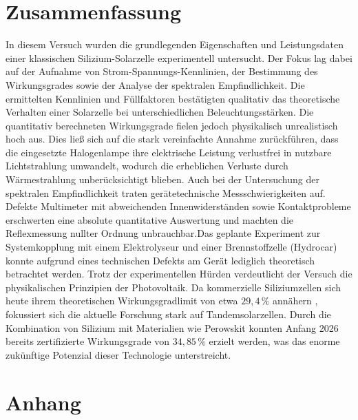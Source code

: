 \documentclass[11pt,a4paper]{article}
\numberwithin{equation}{section}
\begin{document}
\section{Zusammenfassung}
In diesem Versuch wurden die grundlegenden Eigenschaften und Leistungsdaten einer klassischen Silizium-Solarzelle experimentell untersucht. Der Fokus lag dabei auf der Aufnahme von Strom-Spannungs-Kennlinien, der Bestimmung des Wirkungsgrades sowie der Analyse der spektralen Empfindlichkeit.
\noindent Die ermittelten Kennlinien und Füllfaktoren bestätigten qualitativ das theoretische Verhalten einer Solarzelle bei unterschiedlichen Beleuchtungsstärken. Die quantitativ berechneten Wirkungsgrade fielen jedoch physikalisch unrealistisch hoch aus. Dies ließ sich auf die stark vereinfachte Annahme zurückführen, dass die eingesetzte Halogenlampe ihre elektrische Leistung verlustfrei in nutzbare Lichtstrahlung umwandelt, wodurch die erheblichen Verluste durch Wärmestrahlung unberücksichtigt blieben.
\noindent Auch bei der Untersuchung der spektralen Empfindlichkeit traten gerätetechnische Messschwierigkeiten auf. Defekte Multimeter mit abweichenden Innenwiderständen sowie Kontaktprobleme erschwerten eine absolute quantitative Auswertung und machten die Reflexmessung nullter Ordnung unbrauchbar.Das geplante Experiment zur Systemkopplung mit einem Elektrolyseur und einer Brennstoffzelle (Hydrocar) konnte aufgrund eines technischen Defekts am Gerät lediglich theoretisch betrachtet werden.
\noindent Trotz der experimentellen Hürden verdeutlicht der Versuch die physikalischen Prinzipien der Photovoltaik. Da kommerzielle Siliziumzellen sich heute ihrem theoretischen Wirkungsgradlimit von etwa $29,4\,\%$ annähern \cite{limit_silizium}, fokussiert sich die aktuelle Forschung stark auf Tandemsolarzellen. Durch die Kombination von Silizium mit  Materialien wie Perowskit konnten Anfang 2026 bereits zertifizierte Wirkungsgrade von $34,85\,\%$ \cite{longi_2025} erzielt werden, was das enorme zukünftige Potenzial dieser Technologie unterstreicht.


\newpage
\appendix
\newpage
\section{Anhang}

\newpage
\end{document}
